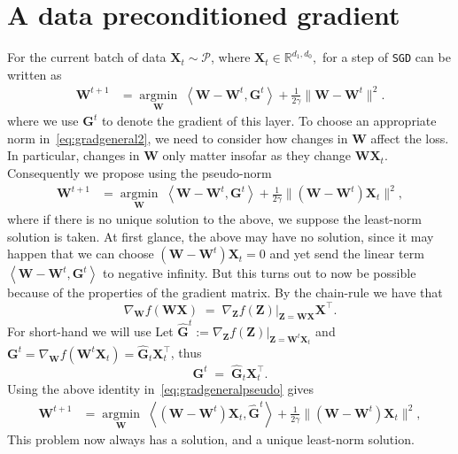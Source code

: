 \documentclass[11pt]{article}
\newcommand{\SGD}{\texttt{SGD} }
\newcommand{\mat}[1]{\bm{#1}}
\newcommand{\dotprod}[1]{\left< #1\right>}
\DeclareMathOperator{\argmininn}{argmin}
\newcommand{\argmin}[1]{ \underset{#1}{\argmininn} \;}
\newcommand{\cP}{\mathcal{ P}}
\newcommand{\mG}{\mat{ G}}
\newcommand{\mX}{\mat{ X}}
\newcommand{\mW}{\mat{ W}}
\newcommand{\mZ}{\mat{ Z}}
\newcommand{\R}{\mathbb{R}}
\begin{document}
\section{A data preconditioned gradient}
For the current batch of data $\mX_t \sim \cP$, where $\mX_t \in \R^{d_1,d_0},$ for 
a step of \SGD can be written as
\begin{align}
    \mW^{t+1} &=  \argmin{\mW} \dotprod{\mW- \mW^t, \mG^t } + \frac{1}{2\gamma}\|\mW - \mW^t\|^2. \label{eq:gradgeneral2}
\end{align}
where we use $\mG^t$ to denote the gradient of this layer. To choose an appropriate norm in~\eqref{eq:gradgeneral2}, we need to consider how changes in $\mW$ affect the loss.
In particular, changes in $\mW$ only matter insofar as they change $\mW \mX_t$. Consequently we propose using the pseudo-norm
\begin{align}
    \mW^{t+1} &=  \argmin{\mW} \dotprod{\mW- \mW^t, \mG^t } + \frac{1}{2\gamma}\|(\mW - \mW^t)\mX_t\|^2,\label{eq:gradgeneralpseudo}
\end{align}
where if there is no unique solution to the above, we suppose the least-norm solution is taken. At first glance, the above may have no solution, since it may happen that we can choose $(\mW - \mW^t)\mX_t=0$ and yet send  the linear term $\dotprod{\mW- \mW^t, \mG^t }$ to negative infinity. But this turns out to now be possible  because of the properties of the gradient matrix. 
By the chain-rule we have that 
\begin{equation} \label{eq:chain-rule}
    \nabla_{\mW} f(\mW \mX) \; =\; \left. \nabla_{\mZ}f(\mZ) \right|_{\mZ = \mW\mX} \mX^\top.    
\end{equation}
For short-hand we will use 
Let  $\hat{\mG}^t:= \left. \nabla_{\mZ}f(\mZ) \right|_{\mZ = \mW^t\mX_t}$ and $\mG^t = \nabla_{\mW} f(\mW^t \mX_t) = \hat{\mG}_t \mX_t^\top$, thus
\begin{equation}\label{eq:chain-rule-G}
    \mG^t  \; = \;  \hat{\mG}_t \mX_t^\top.
\end{equation}
Using the above identity in~\eqref{eq:gradgeneralpseudo} gives
\begin{align}
    \mW^{t+1} &=  \argmin{\mW} \dotprod{(\mW- \mW^t)\mX_t, \hat{\mG}^t } + \frac{1}{2\gamma}\|(\mW - \mW^t)\mX_t\|^2,\label{eq:gradgeneralpseudoXT}
\end{align}
This problem now always has a solution, and a unique least-norm solution.
\end{document}

